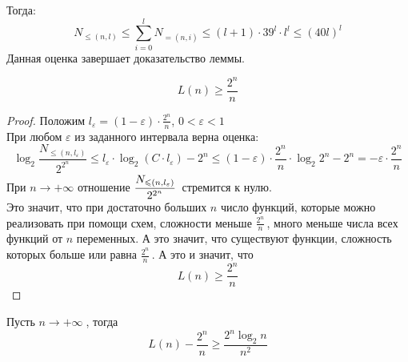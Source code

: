 Тогда:
$$N_{\leq(n,l)} \leq \sum _{i=0} ^{l} N_{=(n,i)} \leq (l+1)\cdot 39^l \cdot l^l \leq (40l)^l$$
Данная оценка завершает доказательство леммы.
\begin{statement}
$$L(n) \geq \frac{2^n}{n}$$
\end{statement}
\begin{proof}
Положим $l_\varepsilon = (1-\varepsilon)\cdot \frac{2^n}{n}$, $0 < \varepsilon < 1$\\
При любом $\varepsilon$ из заданного интервала верна оценка:
$$ \log_2{\frac{N_{\leq(n,l_\varepsilon)}}{2^{2^n}} } \leq l_\varepsilon \cdot \log_2 {(C\cdot l_\varepsilon)} - 2^n \leq (1-\varepsilon)\cdot \frac{2^n}{n} \cdot \log_2 {2^n} - 2^n = -\varepsilon \cdot \frac{2^n}{n}$$
При $n \rightarrow +\infty$ отношение $\cfrac{N_{\leq(n,l_\varepsilon)}}{2^{2^n}} \;$ стремится к нулю.\\

Это значит, что при достаточно больших $n$ число функций, которые можно реализовать при помощи схем, сложности меньше $\frac{2^n}{n}\,$, много меньше числа всех функций от $n$ переменных. А это значит, что существуют функции, сложность которых больше или равна $\frac{2^n}{n}\,$. А это и значит, что 
$$L(n) \geq \frac{2^n}{n}$$
\end{proof}
\begin{theorem}
Пусть $n \rightarrow + \infty \; $, тогда 
$$L(n) - \frac{2^n}{n} \geq \frac{2^n \log_2 n}{n^2} $$
\end{theorem}

